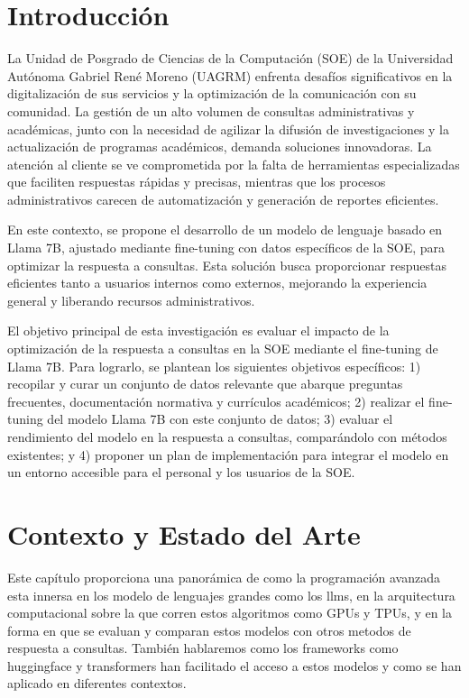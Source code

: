 \documentclass[12pt,twocolumn]{article}
\begin{document}

\section{Introducción}
La Unidad de Posgrado de Ciencias de la Computación (SOE) de la Universidad Autónoma Gabriel René Moreno (UAGRM) enfrenta desafíos significativos en la digitalización de sus servicios y la optimización de la comunicación con su comunidad. 
La gestión de un alto volumen de consultas administrativas y académicas, junto con la necesidad de agilizar la difusión de investigaciones y la actualización de programas académicos, demanda soluciones innovadoras. 
La atención al cliente se ve comprometida por la falta de herramientas especializadas que faciliten respuestas rápidas y precisas, mientras que los procesos administrativos carecen de automatización y generación de reportes eficientes.

En este contexto, se propone el desarrollo de un modelo de lenguaje basado en Llama 7B, ajustado mediante fine-tuning con datos específicos de la SOE, para optimizar la respuesta a consultas. 
Esta solución busca proporcionar respuestas eficientes tanto a usuarios internos como externos, mejorando la experiencia general y liberando recursos administrativos.

El objetivo principal de esta investigación es evaluar el impacto de la optimización de la respuesta a consultas en la SOE mediante el fine-tuning de Llama 7B. 
Para lograrlo, se plantean los siguientes objetivos específicos: 
1) recopilar y curar un conjunto de datos relevante que abarque preguntas frecuentes, documentación normativa y currículos académicos; 
2) realizar el fine-tuning del modelo Llama 7B con este conjunto de datos; 
3) evaluar el rendimiento del modelo en la respuesta a consultas, comparándolo con métodos existentes; y 
4) proponer un plan de implementación para integrar el modelo en un entorno accesible para el personal y los usuarios de la SOE.

\section{Contexto y Estado del Arte}
Este capítulo proporciona una panorámica de como la programación avanzada esta innersa en los modelo de lenguajes grandes como los llms, en la arquitectura computacional sobre la que corren estos algoritmos como GPUs y TPUs, y en la forma en que se evaluan y comparan estos modelos con otros metodos de respuesta a consultas.
También hablaremos como los frameworks como huggingface y transformers han facilitado el acceso a estos modelos y como se han aplicado en diferentes contextos.
\end{document}
